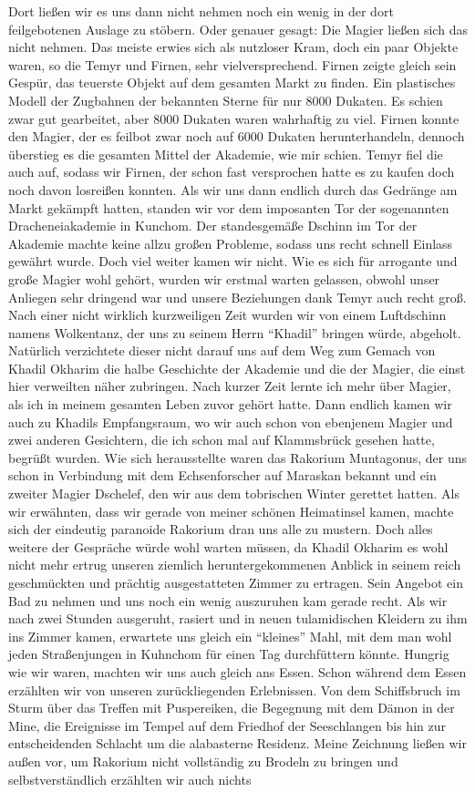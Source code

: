 Dort ließen wir es uns dann nicht nehmen noch ein wenig in der dort feilgebotenen Auslage zu stöbern. Oder genauer gesagt: Die Magier ließen sich das nicht nehmen. Das meiste erwies sich als nutzloser Kram, doch ein paar Objekte waren, so die Temyr und Firnen, sehr vielversprechend. Firnen zeigte gleich sein Gespür, das teuerste Objekt auf dem gesamten Markt zu finden. Ein plastisches Modell der Zugbahnen der bekannten Sterne für nur 8000 Dukaten. Es schien zwar gut gearbeitet, aber 8000 Dukaten waren wahrhaftig zu viel. Firnen konnte den Magier, der es feilbot zwar noch auf 6000 Dukaten herunterhandeln, dennoch überstieg es die gesamten Mittel der Akademie, wie mir schien. Temyr fiel die auch auf, sodass wir Firnen, der schon fast versprochen hatte es zu kaufen doch noch davon losreißen konnten. Als wir uns dann endlich durch das Gedränge am Markt gekämpft hatten, standen wir vor dem imposanten Tor der sogenannten Dracheneiakademie in Kunchom. Der standesgemäße Dschinn im Tor der Akademie machte keine allzu großen Probleme, sodass uns recht schnell Einlass gewährt wurde. Doch viel weiter kamen wir nicht. Wie es sich für arrogante und große Magier wohl gehört, wurden wir erstmal warten gelassen, obwohl unser Anliegen sehr dringend war und unsere Beziehungen dank Temyr auch recht groß. Nach einer nicht wirklich kurzweiligen Zeit wurden wir von einem Luftdschinn namens Wolkentanz, der uns zu seinem Herrn ``Khadil'' bringen würde, abgeholt. Natürlich verzichtete dieser nicht darauf uns auf dem Weg zum Gemach von Khadil Okharim die halbe Geschichte der Akademie und die der Magier, die einst hier verweilten näher zubringen. Nach kurzer Zeit lernte ich mehr über Magier, als ich in meinem gesamten Leben zuvor gehört hatte. Dann endlich kamen wir auch zu Khadils Empfangsraum, wo wir auch schon von ebenjenem Magier und zwei anderen Gesichtern, die ich schon mal auf Klammsbrück gesehen hatte, begrüßt wurden. Wie sich herausstellte waren das Rakorium Muntagonus, der uns schon in Verbindung mit dem Echsenforscher auf Maraskan bekannt und ein zweiter Magier Dschelef, den wir aus dem tobrischen Winter gerettet hatten. Als wir erwähnten, dass wir gerade von meiner schönen Heimatinsel kamen, machte sich der eindeutig paranoide Rakorium dran uns alle zu mustern. Doch alles weitere der Gespräche würde wohl warten müssen, da Khadil Okharim es wohl nicht mehr ertrug unseren ziemlich heruntergekommenen Anblick in seinem reich geschmückten und prächtig ausgestatteten Zimmer zu ertragen. Sein Angebot ein Bad zu nehmen und uns noch ein wenig auszuruhen kam gerade recht. Als wir nach zwei Stunden ausgeruht, rasiert und in neuen tulamidischen Kleidern zu ihm ins Zimmer kamen, erwartete uns gleich ein ``kleines'' Mahl, mit dem man wohl jeden Straßenjungen in Kuhnchom für einen Tag durchfüttern könnte. Hungrig wie wir waren, machten wir uns auch gleich ans Essen. Schon während dem Essen erzählten wir von unseren zurückliegenden Erlebnissen. Von dem Schiffsbruch im Sturm über das Treffen mit Puspereiken, die Begegnung mit dem Dämon in der Mine, die Ereignisse im Tempel auf dem Friedhof der Seeschlangen bis hin zur entscheidenden Schlacht um die alabasterne Residenz. Meine Zeichnung ließen wir außen vor, um Rakorium nicht vollständig zu Brodeln zu bringen und selbstverständlich erzählten wir auch nichts 